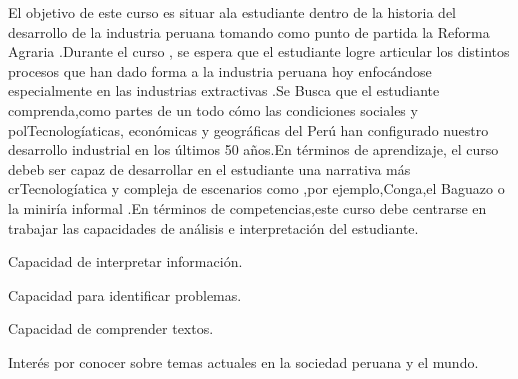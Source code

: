 \begin{syllabus}


\begin{justification}
El objetivo de este curso es situar ala estudiante dentro de la historia del desarrollo de la industria peruana tomando como punto de partida la Reforma Agraria .Durante el curso , se espera que el estudiante logre articular los distintos 
procesos que han dado forma a  la industria peruana hoy enfocándose  especialmente en las industrias extractivas .Se Busca que el estudiante  comprenda,como partes de un todo cómo las condiciones sociales y polTecnologíaticas,
económicas y geográficas del Perú  han configurado nuestro desarrollo industrial en los últimos 50 años.En términos de aprendizaje, el curso debeb ser capaz de desarrollar en el estudiante  una narrativa más crTecnologíatica y compleja de escenarios como ,por ejemplo,Conga,el  Baguazo 
o la  miniría informal .En términos de competencias,este curso debe centrarse en  trabajar las capacidades de análisis e interpretación del estudiante.

\end{justification}

\begin{goals}
\item Capacidad de interpretar información.
\item Capacidad para identificar problemas.
\item Capacidad de comprender textos.
\item Interés por conocer sobre temas actuales en la sociedad peruana y el mundo. 
\end{goals}

\begin{outcomes}
    \item {} 
    \item {} 
    \item {} 
    \item {} 
    \item {} 
\end{outcomes}

\begin{competences}
    \item {}
    \item {}
    \item {}
    \item {}
\end{competences}


\end{syllabus}
